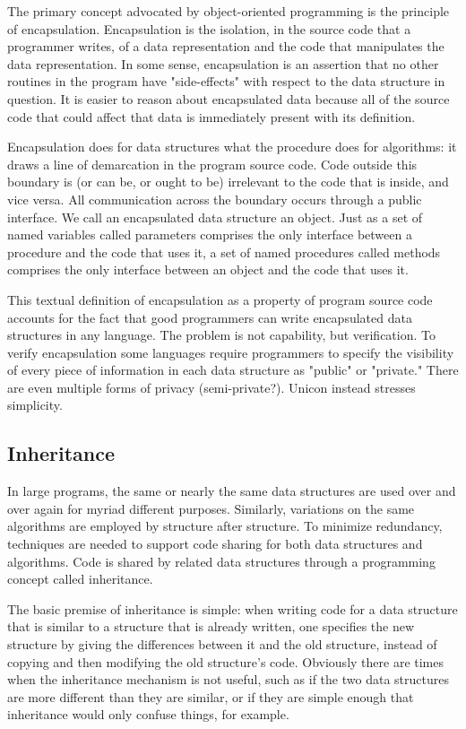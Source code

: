 The primary concept advocated by object-oriented programming is the
principle of encapsulation. Encapsulation is the
isolation, in the source code that a programmer writes, of a data
representation and the code that manipulates the data representation.
In some sense, encapsulation is an assertion that no other routines in
the program have "side-effects" with
respect to the data structure in question. It is easier to reason about
encapsulated data because all of the source code that could affect that
data is immediately present with its definition. 

Encapsulation does for data structures what the procedure does for
algorithms: it draws a line of demarcation in the program source code.
Code outside this boundary is (or can be, or ought to be) irrelevant to
the code that is inside, and vice versa. All communication across the
boundary occurs through a public interface. We call an encapsulated
data structure an object. Just as a set of named variables called
parameters comprises the only interface between a procedure and the
code that uses it, a set of named procedures called methods comprises
the only interface between an object and the code that uses it. 

This textual definition of encapsulation as a property of program source
code accounts for the fact that good programmers can write encapsulated
data structures in any language. The problem is not capability, but
verification. To verify encapsulation some languages require
programmers to specify the visibility of every piece of information in
each data structure as "public" or
"private." There are even multiple forms of
privacy (semi-private?). Unicon instead stresses simplicity. 

\subsection{Inheritance}

In large programs, the same or nearly the same data structures are used
over and over again for myriad different purposes. Similarly,
variations on the same algorithms are employed by structure after
structure. To minimize redundancy, techniques are needed to support
code sharing for both data structures and algorithms. Code is shared by
related data structures through a programming concept called
inheritance. 

The basic premise of inheritance is simple: when writing code for a data
structure that is similar to a structure that is already written, one
specifies the new structure by giving the differences between it and
the old structure, instead of copying and then modifying the old
structure's code. Obviously there are times when the
inheritance mechanism is not useful, such as if the two data structures
are more different than they are similar, or if they are simple enough
that inheritance would only confuse things, for example. 

